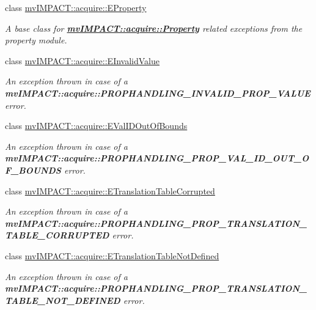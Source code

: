 \begin{DoxyCompactItemize}
class \hyperlink{classmv_i_m_p_a_c_t_1_1acquire_1_1_e_property}{mv\+I\+M\+P\+A\+C\+T\+::acquire\+::\+E\+Property}
\begin{DoxyCompactList}\small\item\em A base class for {\bfseries \hyperlink{classmv_i_m_p_a_c_t_1_1acquire_1_1_property}{mv\+I\+M\+P\+A\+C\+T\+::acquire\+::\+Property}} related exceptions from the property module. \end{DoxyCompactList}\item 
class \hyperlink{classmv_i_m_p_a_c_t_1_1acquire_1_1_e_invalid_value}{mv\+I\+M\+P\+A\+C\+T\+::acquire\+::\+E\+Invalid\+Value}
\begin{DoxyCompactList}\small\item\em An exception thrown in case of a {\bfseries mv\+I\+M\+P\+A\+C\+T\+::acquire\+::\+P\+R\+O\+P\+H\+A\+N\+D\+L\+I\+N\+G\+\_\+\+I\+N\+V\+A\+L\+I\+D\+\_\+\+P\+R\+O\+P\+\_\+\+V\+A\+L\+U\+E} error. \end{DoxyCompactList}\item 
class \hyperlink{classmv_i_m_p_a_c_t_1_1acquire_1_1_e_val_i_d_out_of_bounds}{mv\+I\+M\+P\+A\+C\+T\+::acquire\+::\+E\+Val\+I\+D\+Out\+Of\+Bounds}
\begin{DoxyCompactList}\small\item\em An exception thrown in case of a {\bfseries mv\+I\+M\+P\+A\+C\+T\+::acquire\+::\+P\+R\+O\+P\+H\+A\+N\+D\+L\+I\+N\+G\+\_\+\+P\+R\+O\+P\+\_\+\+V\+A\+L\+\_\+\+I\+D\+\_\+\+O\+U\+T\+\_\+\+O\+F\+\_\+\+B\+O\+U\+N\+D\+S} error. \end{DoxyCompactList}\item 
class \hyperlink{classmv_i_m_p_a_c_t_1_1acquire_1_1_e_translation_table_corrupted}{mv\+I\+M\+P\+A\+C\+T\+::acquire\+::\+E\+Translation\+Table\+Corrupted}
\begin{DoxyCompactList}\small\item\em An exception thrown in case of a {\bfseries mv\+I\+M\+P\+A\+C\+T\+::acquire\+::\+P\+R\+O\+P\+H\+A\+N\+D\+L\+I\+N\+G\+\_\+\+P\+R\+O\+P\+\_\+\+T\+R\+A\+N\+S\+L\+A\+T\+I\+O\+N\+\_\+\+T\+A\+B\+L\+E\+\_\+\+C\+O\+R\+R\+U\+P\+T\+E\+D} error. \end{DoxyCompactList}\item 
class \hyperlink{classmv_i_m_p_a_c_t_1_1acquire_1_1_e_translation_table_not_defined}{mv\+I\+M\+P\+A\+C\+T\+::acquire\+::\+E\+Translation\+Table\+Not\+Defined}
\begin{DoxyCompactList}\small\item\em An exception thrown in case of a {\bfseries mv\+I\+M\+P\+A\+C\+T\+::acquire\+::\+P\+R\+O\+P\+H\+A\+N\+D\+L\+I\+N\+G\+\_\+\+P\+R\+O\+P\+\_\+\+T\+R\+A\+N\+S\+L\+A\+T\+I\+O\+N\+\_\+\+T\+A\+B\+L\+E\+\_\+\+N\+O\+T\+\_\+\+D\+E\+F\+I\+N\+E\+D} error. \end{DoxyCompactList}\item 

\end{DoxyCompactItemize}
